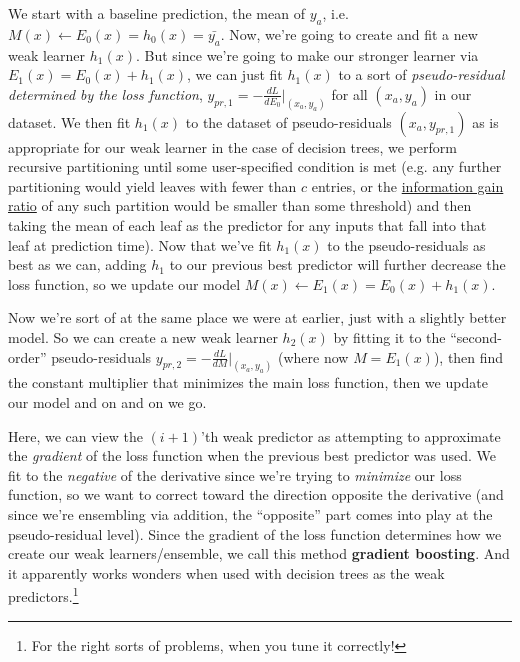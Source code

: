 \documentclass[../main/main.tex]{subfiles}
\begin{document}
We start with a baseline prediction, the mean of \(y_a\), i.e. 
\(M(x) \leftarrow E_0(x) = h_0(x) = \bar{y_a}\).
Now, we're going to create and fit a new weak learner \(h_1(x)\). But since we're going to
make our stronger learner via \(E_1(x) = E_0(x) + h_1(x)\), we can just fit \(h_1(x)\)
to a sort of \emph{pseudo-residual determined by the loss function}, 
\(y_{pr,1} = - \frac{dL}{dE_0} \Bigr|_{\left(x_a, y_a\right)}\) 
for all \(\left(x_a, y_a\right)\) in our dataset. 
We then fit \(h_1(x)\) to the dataset of
pseudo-residuals \((x_a, y_{pr,1})\) as is appropriate for our weak learner \textemdash{}
in the case of decision trees, we perform recursive partitioning until some 
user-specified condition is met (e.g. any further partitioning would yield leaves with
fewer than \(c\) entries, or the \href{https://en.wikipedia.org/wiki/Information_gain_ratio}
{information gain ratio} of any such partition would be smaller
than some threshold) and then taking the mean of each leaf as the predictor for any
inputs that fall into that leaf at prediction time).
Now that we've fit \(h_1(x)\) to the pseudo-residuals as best as we can, adding \(h_1\) to our
previous best predictor will further decrease the loss function, so we 
update our model \(M(x) \leftarrow E_1(x) = E_0(x) + h_1(x)\). 

Now we're sort of at the same place we were at earlier, just with a slightly better model.
So we can create a new weak learner \(h_2(x)\) by fitting it to the ``second-order''
pseudo-residuals \(y_{pr,2} = - \frac{dL}{dM} \Bigr|_{\left(x_a, y_a\right)}\) 
(where now \(M = E_1(x)\)),
then find the constant multiplier that minimizes the
main loss function, then we update our model \textemdash and on and on we go.

Here, we can view the \((i+1)\)'th weak predictor as attempting 
to approximate the \emph{gradient}
of the loss function when the previous best predictor was used.
We fit to the \emph{negative} of the derivative since we're trying to \emph{minimize}
our loss function, so we want to correct toward the direction opposite the derivative
(and since we're ensembling via addition, the ``opposite'' part comes into play
at the pseudo-residual level).
Since the gradient of the loss function determines how we create our weak learners/ensemble, 
we call this method \textbf{gradient boosting}. And it apparently works wonders
when used with decision trees as the weak predictors.\footnote{
  For the right sorts of problems, when you tune it correctly!
  }
\end{document}

